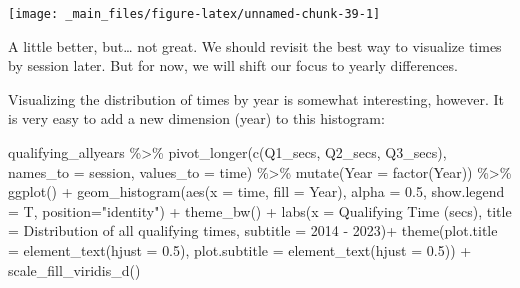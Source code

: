 \documentclass[
]{book}
\newenvironment{Shaded}{\begin{snugshade}}{\end{snugshade}}
\newcommand{\AttributeTok}[1]{\textcolor[rgb]{0.77,0.63,0.00}{#1}}
\newcommand{\FloatTok}[1]{\textcolor[rgb]{0.00,0.00,0.81}{#1}}
\newcommand{\FunctionTok}[1]{\textcolor[rgb]{0.00,0.00,0.00}{#1}}
\newcommand{\NormalTok}[1]{#1}
\newcommand{\SpecialCharTok}[1]{\textcolor[rgb]{0.00,0.00,0.00}{#1}}
\newcommand{\StringTok}[1]{\textcolor[rgb]{0.31,0.60,0.02}{#1}}
\begin{document}
\begin{center}\texttt{[image: \_main\_files/figure-latex/unnamed-chunk-39-1]} \end{center}

A little better, but\ldots{} not great. We should revisit the best way to visualize times by session later. But for now, we will shift our focus to yearly differences.

Visualizing the distribution of times by year is somewhat interesting, however. It is very easy to add a new dimension (year) to this histogram:

\begin{Shaded}
\begin{Highlighting}[]
\NormalTok{qualifying\_allyears }\SpecialCharTok{\%\textgreater{}\%}
  \FunctionTok{pivot\_longer}\NormalTok{(}\FunctionTok{c}\NormalTok{(}\StringTok{\textquotesingle{}Q1\_secs\textquotesingle{}}\NormalTok{, }\StringTok{\textquotesingle{}Q2\_secs\textquotesingle{}}\NormalTok{, }\StringTok{\textquotesingle{}Q3\_secs\textquotesingle{}}\NormalTok{),}
               \AttributeTok{names\_to =} \StringTok{\textquotesingle{}session\textquotesingle{}}\NormalTok{,}
               \AttributeTok{values\_to =} \StringTok{\textquotesingle{}time\textquotesingle{}}\NormalTok{) }\SpecialCharTok{\%\textgreater{}\%}
  \FunctionTok{mutate}\NormalTok{(}\AttributeTok{Year =} \FunctionTok{factor}\NormalTok{(Year)) }\SpecialCharTok{\%\textgreater{}\%}
  \FunctionTok{ggplot}\NormalTok{() }\SpecialCharTok{+}
  \FunctionTok{geom\_histogram}\NormalTok{(}\FunctionTok{aes}\NormalTok{(}\AttributeTok{x =}\NormalTok{ time, }\AttributeTok{fill =}\NormalTok{ Year),}
                 \AttributeTok{alpha =} \FloatTok{0.5}\NormalTok{, }\AttributeTok{show.legend =}\NormalTok{ T,}
                 \AttributeTok{position=}\StringTok{"identity"}\NormalTok{) }\SpecialCharTok{+}
  \FunctionTok{theme\_bw}\NormalTok{() }\SpecialCharTok{+}
  \FunctionTok{labs}\NormalTok{(}\AttributeTok{x =} \StringTok{\textquotesingle{}Qualifying Time (secs)\textquotesingle{}}\NormalTok{,}
       \AttributeTok{title =} \StringTok{\textquotesingle{}Distribution of all qualifying times\textquotesingle{}}\NormalTok{,}
       \AttributeTok{subtitle =} \StringTok{\textquotesingle{}2014 {-} 2023\textquotesingle{}}\NormalTok{)}\SpecialCharTok{+}
  \FunctionTok{theme}\NormalTok{(}\AttributeTok{plot.title =} \FunctionTok{element\_text}\NormalTok{(}\AttributeTok{hjust =} \FloatTok{0.5}\NormalTok{),}
        \AttributeTok{plot.subtitle =} \FunctionTok{element\_text}\NormalTok{(}\AttributeTok{hjust =} \FloatTok{0.5}\NormalTok{)) }\SpecialCharTok{+}
  \FunctionTok{scale\_fill\_viridis\_d}\NormalTok{()}
\end{Highlighting}
\end{Shaded}
\end{document}
